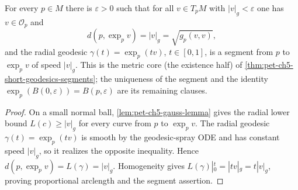 \begin{lemma}
  \label{lem:pet-ch5-radial-geodesic-segment}


  For every $p\in M$ there is $\varepsilon>0$ such that for all $v\in T_pM$ with
  $|v|_g<\varepsilon$ one has $v\in\mathcal O_p$ and
  \[
    d(p,\exp_p v)=|v|_g=\sqrt{g_p(v,v)},
  \]
  and the radial geodesic $\gamma(t)=\exp_p(tv)$, $t\in[0,1]$, is a segment from
  $p$ to $\exp_p v$ of speed $|v|_g$. This is the metric core (the existence half)
  of \cref{thm:pet-ch5-short-geodesics-segments}; the uniqueness of the segment and
  the identity $\exp_p(B(0,\varepsilon))=B(p,\varepsilon)$ are its remaining
  clauses.
\end{lemma}
\begin{proof}

  \sketch
  On a small normal ball, \cref{lem:pet-ch5-gauss-lemma} gives the radial lower
  bound $L(c)\ge|v|_g$ for every curve from $p$ to $\exp_pv$.  The radial geodesic
  $\gamma(t)=\exp_p(tv)$ is smooth by the geodesic-spray ODE and has constant speed
  $|v|_g$, so it realizes the opposite inequality.  Hence
  $d(p,\exp_pv)=L(\gamma)=|v|_g$.  Homogeneity gives
  $L(\gamma)|_0^t=|tv|_g=t|v|_g$, proving proportional arclength and the segment
  assertion.
\end{proof}

